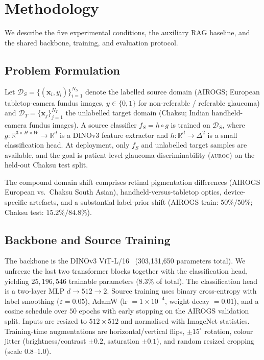 \documentclass[11pt]{article}
\newcommand{\src}{AIROGS}
\newcommand{\auroc}{\textsc{auroc}}
\begin{document}
\section{Methodology}
\label{sec:method}

We describe the five experimental conditions, the auxiliary RAG baseline,
and the shared backbone, training, and evaluation protocol.

\subsection{Problem Formulation}

Let $\mathcal{D}_S = \bigl\{(\mathbf{x}_i, y_i)\bigr\}_{i=1}^{N_S}$ denote the
labelled source domain (\src{}; European tabletop-camera fundus images,
$y \in \{0,1\}$ for non-referable / referable glaucoma) and
$\mathcal{D}_T = \bigl\{\mathbf{x}_j\bigr\}_{j=1}^{N_T}$ the unlabelled
target domain (Chaksu; Indian handheld-camera fundus images). A source
classifier $f_S = h \circ g$ is trained on $\mathcal{D}_S$, where
$g: \mathbb{R}^{3 \times H \times W} \to \mathbb{R}^d$ is a DINOv3
feature extractor and $h: \mathbb{R}^d \to \Delta^2$ is a small
classification head. At deployment, only $f_S$ and unlabelled target
samples are available, and the goal is patient-level glaucoma
discriminability (\auroc{}) on the held-out Chaksu test split.

The compound domain shift comprises retinal pigmentation differences
(\src{} European vs.\ Chaksu South Asian), handheld-versus-tabletop optics,
device-specific artefacts, and a substantial label-prior shift
(\src{} train: $50\%/50\%$; Chaksu test: $15.2\%/84.8\%$).

\subsection{Backbone and Source Training}
\label{ssec:source}

The backbone is the DINOv3 ViT-L/16~\cite{simeoni2025} (303{,}131{,}650
parameters total). We unfreeze the last two transformer blocks together
with the classification head, yielding $25{,}196{,}546$ trainable
parameters ($8.3\%$ of total). The classification head is a two-layer
MLP $d \!\to\! 512 \!\to\! 2$. Source training uses binary cross-entropy
with label smoothing ($\varepsilon = 0.05$), AdamW (lr $= 1\times10^{-4}$,
weight decay $= 0.01$), and a cosine schedule over $50$ epochs with early
stopping on the \src{} validation split. Inputs are resized to
$512 \times 512$ and normalised with ImageNet statistics. Training-time
augmentations are horizontal/vertical flips, $\pm 15^\circ$ rotation,
colour jitter (brightness/contrast $\pm 0.2$, saturation $\pm 0.1$), and
random resized cropping (scale $0.8$--$1.0$).
\end{document}
